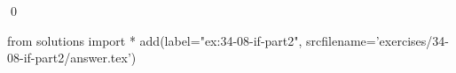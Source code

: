
\begin{ex}
  \label{ex:34-08-if-part2}
  
  \qed
\end{ex}
\begin{python0}
from solutions import *
add(label="ex:34-08-if-part2",
    srcfilename='exercises/34-08-if-part2/answer.tex')
\end{python0}
